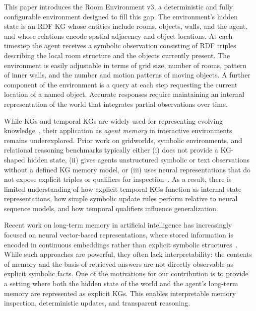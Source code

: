 \documentclass[11pt]{article}
\begin{document}
This paper introduces the Room Environment v3, a deterministic and fully configurable
environment designed to fill this gap. The environment’s
hidden state is an RDF KG whose entities include rooms,
objects, walls, and the agent, and whose relations encode spatial
adjacency and object locations. At each timestep the agent receives a
symbolic observation consisting of RDF triples describing the local room
structure and the objects currently present. The environment is easily
adjustable in terms of grid size, number of rooms, pattern of inner
walls, and the number and motion patterns of moving objects. A further
component of the environment is a query at each step requesting the
current location of a named object. Accurate responses require
maintaining an internal representation of the world that integrates
partial observations over time.

While KGs and temporal KGs are widely used for representing evolving
knowledge~\cite{Hogan_2021,dellaglio2017streamreasoning,moreau2012prov,DBLP:journals/corr/abs-1809-03202},
their application as \emph{agent memory} in interactive environments
remains underexplored. Prior work on gridworlds, symbolic environments,
and relational reasoning benchmarks typically either (i) does not
provide a KG-shaped hidden state, (ii) gives agents unstructured
symbolic or text observations without a defined KG memory model, or
(iii) uses neural representations that do not expose explicit triples or
qualifiers for inspection~\cite{Cote2018TextWorld,Hausknecht2020Jericho,Ammanabrolu2020Graph,10.1609/aaai.v37i1.25075,battaglia2018relationalinductivebiasesdeep,zambaldi2018relationaldeepreinforcementlearning,graves2014neural,graves2016hybrid,Wayne2018MERLIN,DBLP:journals/corr/abs-1803-10122}.
 As a result, there is limited
understanding of how explicit temporal KGs function as internal state
representations, how simple symbolic update rules perform relative to
neural sequence models, and how temporal qualifiers influence
generalization.


Recent work on long-term memory in artificial intelligence has
increasingly focused on neural vector-based representations, where
stored information is encoded in continuous embeddings rather than
explicit symbolic structures~\cite{graves2014neural,graves2016hybrid,Wayne2018MERLIN,DBLP:journals/corr/abs-1803-10122,pritzel2017neuralepisodiccontrol,blundell2016modelfreeepisodiccontrol}. While such
approaches are powerful, they often lack interpretability: the contents
of memory and the basis of retrieved answers are not directly observable
as explicit symbolic facts. One of the motivations for our contribution
is to provide a setting where both the hidden state of the world and the
agent’s long-term memory are represented as explicit KGs. This enables interpretable memory inspection, deterministic updates, and transparent reasoning.
\end{document}
